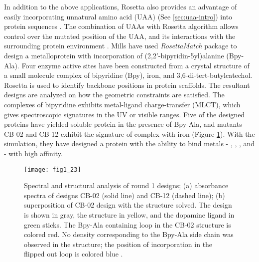 \begin{refsection}
In addition to the above applications, Rosetta also provides an
advantage of easily incorporating unnatural amino acid (UAA) (See
\ref{sec:uaa-intro}) into protein sequences \cite{Renfrew2012b}. The
combination of UAAs with Rosetta algorithm allows control over the mutated
position of the UAA, and its interactions with the surrounding
protein environment \cite{Renfrew2012b}. Mills  have used
\emph{RosettaMatch} package to design a metalloprotein with incorporation of
(2,2’-bipyridin-5yl)alanine (Bpy-Ala)\cite{Mills2013}.  Four enzyme active
sites have been constructed from a crystal structure of a small molecule
complex of bipyridine (Bpy), iron, and 3,6-di-tert-butylcatechol. Rosetta is
used to identify backbone positions in protein scaffolds. The resultant designs
are analyzed on how the geometric constraints are satisfied. The complexes of
bipyridine exhibits metal-ligand charge-transfer (MLCT), which gives
spectroscopic signatures in the UV or visible ranges. Five of the designed
proteins have yielded soluble protein in the presence of Bpy-Ala, and mutants
CB-02 and CB-12 exhibit the signature of complex with iron (Figure
\ref{fig:rosetta-uaa}). With the simulation, they have designed a protein with
the ability to bind metals - , , , and
 - with high affinity. 
\begin{figure}[htbp] \centering \texttt{[image: fig1\_23]}
    \caption[Spectral and structural analysis of round 1 designs; (a)
        absorbance spectra of designs CB-02 (solid line) and CB-12 (dashed
        line); (b) superposition of CB-02 design with the structure solved. The
        design is shown in gray, the structure in yellow, and the dopamine
        ligand in green sticks. The Bpy-Ala containing loop in the CB-02
        structure is colored red. No density corresponding to the Bpy-Ala side
        chain was observed in the structure; the position of incorporation in
    the flipped out loop is colored blue.] {Spectral and structural analysis of
        round 1 designs; (a) absorbance spectra of designs CB-02 (solid line)
        and CB-12 (dashed line); (b) superposition of CB-02 design with the
        structure solved. The design is shown in gray, the structure in yellow,
        and the dopamine ligand in green sticks. The Bpy-Ala containing loop in
        the CB-02 structure is colored red. No density corresponding to the
        Bpy-Ala side chain was observed in the structure; the position of
        incorporation in the flipped out loop is colored blue \cite{Mills2013}.}
        \label{fig:rosetta-uaa} 
\end{figure}


\end{refsection}
